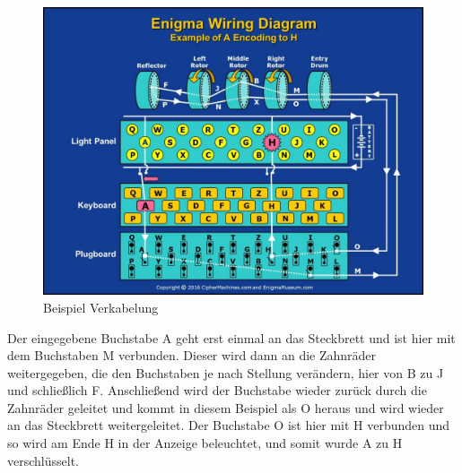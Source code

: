 \begin{figure}[H]
\centering
\includegraphics[scale=0.2]{Enigma_Maschine_Beispiel.jpg}
\caption{Beispiel Verkabelung}
\label{fig:enigma}
\end{figure}

Der eingegebene Buchstabe A geht erst einmal an das Steckbrett und ist hier mit dem Buchstaben M verbunden. Dieser wird dann an die Zahnräder weitergegeben, die den Buchstaben je nach Stellung verändern, hier von B zu J und schließlich F. Anschließend wird der Buchstabe wieder zurück durch die Zahnräder geleitet und kommt in diesem Beispiel als O heraus und wird wieder an das Steckbrett weitergeleitet. Der Buchstabe O ist hier mit H verbunden und so wird am Ende H in der Anzeige beleuchtet, und somit wurde A zu H verschlüsselt.

